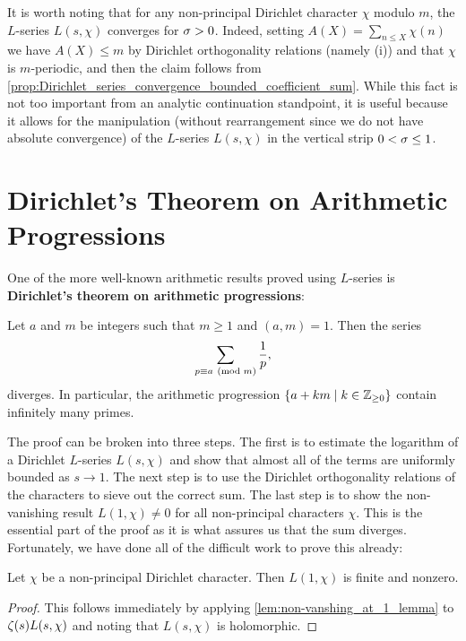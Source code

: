       It is worth noting that for any non-principal Dirichlet character $\chi$ modulo $m$, the $L$-series $L(s,\chi)$ converges for $\sigma > 0$. Indeed, setting $A(X) = \sum_{n \le X}\chi(n)$ we have $A(X) \le m$ by  Dirichlet orthogonality relations (namely (i)) and that $\chi$ is $m$-periodic, and then the claim follows from \cref{prop:Dirichlet_series_convergence_bounded_coefficient_sum}. While this fact is not too important from an analytic continuation standpoint, it is useful because it allows for the manipulation (without rearrangement since we do not have absolute convergence) of the $L$-series $L(s,\chi)$ in the vertical strip $0 < \sigma \le 1$.
  \section{Dirichlet's Theorem on Arithmetic Progressions}
    One of the more well-known arithmetic results proved using $L$-series is \textbf{Dirichlet's theorem on arithmetic progressions}:

    \begin{theorem*}\label{thm:Dirichlet's_theorem_on_primes_in_arithmetic_progressions}
      Let $a$ and $m$ be integers such that $m \ge 1$ and $(a,m) = 1$. Then the series
      \[
        \sum_{p \equiv a \ (\mathrm{mod}\text{ }m)}\frac{1}{p},
      \]
      diverges. In particular, the arithmetic progression $\{a+km \mid k \in \mathbb{Z}_{\ge 0}\}$ contain infinitely many primes.
    \end{theorem*}

    The proof can be broken into three steps. The first is to estimate the logarithm of a Dirichlet $L$-series $L(s,\chi)$ and show that almost all of the terms are uniformly bounded as $s \to 1$. The next step is to use the Dirichlet orthogonality relations of the characters to sieve out the correct sum. The last step is to show the non-vanishing result $L(1,\chi) \neq 0$ for all non-principal characters $\chi$. This is the essential part of the proof as it is what assures us that the sum diverges. Fortunately, we have done all of the difficult work to prove this already:

    \begin{theorem}\label{thm:non-vanishing_of_Dirichlet_L-functions_at_s=1}
      Let $\chi$ be a non-principal Dirichlet character. Then $L(1,\chi)$ is finite and nonzero.
    \end{theorem}
    \begin{proof}
      This follows immediately by applying \cref{lem:non-vanshing_at_1_lemma} to $\zeta(s)L(s,\chi)$ and noting that $L(s,\chi)$ is holomorphic.
    \end{proof}


